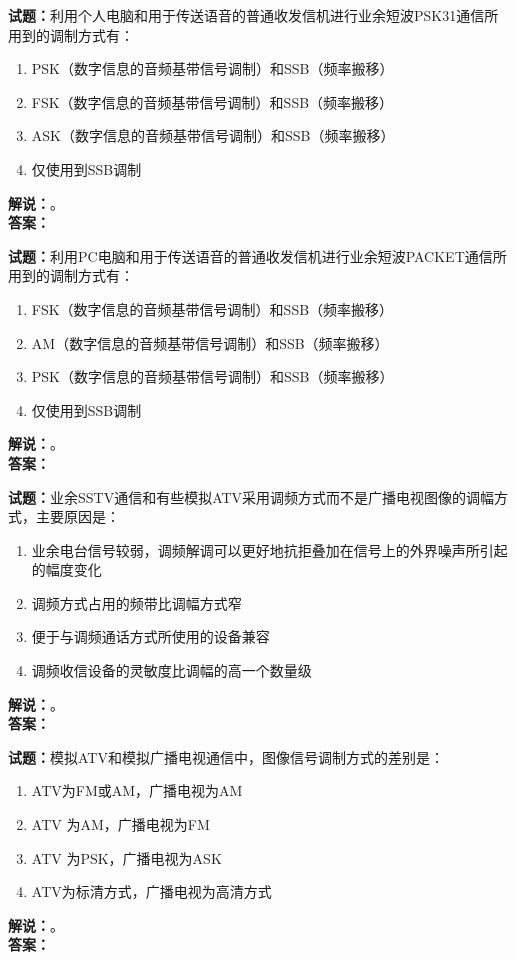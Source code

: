 \documentclass{ctexbook}
\begin{document}
\bigskip

\noindent\textbf{试题：}利用个人电脑和用于传送语音的普通收发信机进行业余短波PSK31通信所用到的调制方式有：
\begin{enumerate}[leftmargin=3em]
  \item PSK（数字信息的音频基带信号调制）和SSB（频率搬移）
  \item FSK（数字信息的音频基带信号调制）和SSB（频率搬移）
  \item ASK（数字信息的音频基带信号调制）和SSB（频率搬移）
  \item 仅使用到SSB调制
\end{enumerate}
\noindent\textbf{解说：}\textbf{}。\\\noindent\textbf{答案：}

\bigskip

\noindent\textbf{试题：}利用PC电脑和用于传送语音的普通收发信机进行业余短波PACKET通信所用到的调制方式有：
\begin{enumerate}[leftmargin=3em]
  \item FSK（数字信息的音频基带信号调制）和SSB（频率搬移）
  \item AM（数字信息的音频基带信号调制）和SSB（频率搬移）
  \item PSK（数字信息的音频基带信号调制）和SSB（频率搬移）
  \item 仅使用到SSB调制
\end{enumerate}
\noindent\textbf{解说：}\textbf{}。\\\noindent\textbf{答案：}

\bigskip

\noindent\textbf{试题：}业余SSTV通信和有些模拟ATV采用调频方式而不是广播电视图像的调幅方式，主要原因是：
\begin{enumerate}[leftmargin=3em]
  \item 业余电台信号较弱，调频解调可以更好地抗拒叠加在信号上的外界噪声所引起的幅度变化
  \item 调频方式占用的频带比调幅方式窄
  \item 便于与调频通话方式所使用的设备兼容
  \item 调频收信设备的灵敏度比调幅的高一个数量级
\end{enumerate}
\noindent\textbf{解说：}\textbf{}。\\\noindent\textbf{答案：}

\bigskip

\noindent\textbf{试题：}模拟ATV和模拟广播电视通信中，图像信号调制方式的差别是：
\begin{enumerate}[leftmargin=3em]
  \item ATV为FM或AM，广播电视为AM
  \item ATV 为AM，广播电视为FM
  \item ATV 为PSK，广播电视为ASK
  \item ATV为标清方式，广播电视为高清方式
\end{enumerate}
\noindent\textbf{解说：}\textbf{}。\\\noindent\textbf{答案：}
\end{document}
